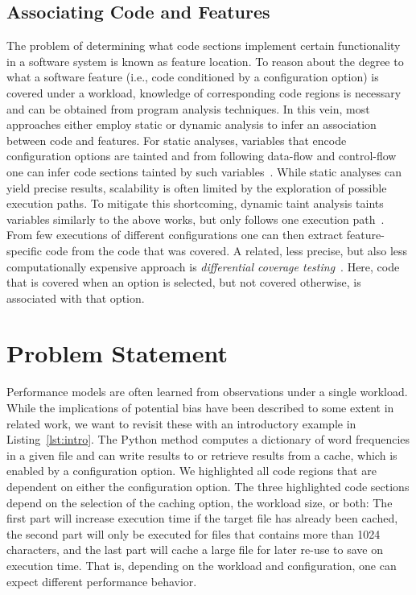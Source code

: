 \subsection{Associating Code and Features}\label{sec:feature_location}
The problem of determining what code sections implement certain functionality in a software system is known as feature location. To reason about the degree to what a software feature (i.e., code conditioned by a configuration option) is covered under a workload, knowledge of corresponding code regions is necessary and can be obtained from program analysis techniques.
In this vein, most approaches either employ static or dynamic analysis to infer an association between code and features. For static analyses, variables that encode configuration options are tainted and from following data-flow and control-flow one can infer code sections tainted by such variables~\cite{velez_2020_configcrusher_jase,lillack_2018_lotrack_tse,luo_2019_cova}.
While static analyses can yield precise results, scalability is often limited by the exploration of possible execution paths. To mitigate this shortcoming, dynamic taint analysis taints variables similarly to the above works, but only follows one execution path~\cite{bell_phosphor_2014,velez_comprex_2021,splat_kim_2013}. From few executions of different configurations one can then extract feature-specific code from the code that was covered. A related, less precise, but also less computationally expensive approach is \emph{differential coverage testing}~\cite{wong_integrated_2005,wilde_early_1996,agrawal_fault_1995,simmons_industrial_2006,chen_dynamic_nodate,sherwood_reducing_nodate}. Here, code that is covered when an option is selected, but not covered otherwise, is associated with that option.

\section{Problem Statement}
Performance models are often learned from observations under a single workload. While the implications of potential bias have been described to some extent in related work, we want to revisit these with an introductory example in Listing~\ref{lst:intro}. The Python method computes a dictionary of word frequencies in a given file and can write results to or retrieve results from a cache, which is enabled by a configuration option. We highlighted all code regions that are dependent on either the configuration option. The three highlighted code sections depend on the selection of the caching option, the workload size, or both: The first part will increase execution time if the target file has already been cached, the second part will only be executed for files that contains more than 1024 characters, and the last part will cache a large file for later re-use to save on execution time. That is, depending on the workload and configuration, one can expect different performance behavior. 

